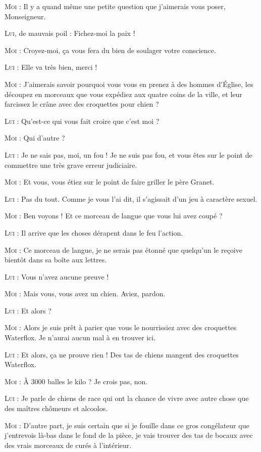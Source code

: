 \begin{dialogue}

\textsc{Moi} : Il y a quand même une petite question que j’aimerais vous poser, Monseigneur.

\textsc{Lui}, de mauvais poil : Fichez-moi la paix !

\textsc{Moi} : Croyez-moi, ça vous fera du bien de soulager votre conscience.

\textsc{Lui} : Elle va très bien, merci !

\textsc{Moi} : J’aimerais savoir pourquoi vous vous en prenez à des hommes d’Église, les découpez en morceaux que vous expédiez aux quatre coins de la ville, et leur farcissez le crâne avec des croquettes pour chien ?

\textsc{Lui} : Qu’est-ce qui vous fait croire que c’est moi ?

\textsc{Moi} : Qui d’autre ?

\textsc{Lui} : Je ne sais pas, moi, un fou ! Je ne suis pas fou, et vous êtes sur le point de commettre une très grave erreur judiciaire.

\textsc{Moi} : Et vous, vous étiez sur le point de faire griller le père Granet.

\textsc{Lui} : Pas du tout. Comme je vous l’ai dit, il s’agissait d’un jeu à caractère sexuel.

\textsc{Moi} : Ben voyons ! Et ce morceau de langue que vous lui avez coupé ?

\textsc{Lui} : Il arrive que les choses dérapent dans le feu l’action.

\textsc{Moi} : Ce morceau de langue, je ne serais pas étonné que quelqu’un le reçoive bientôt dans sa boîte aux lettres.

\textsc{Lui} : Vous n’avez aucune preuve !

\textsc{Moi} : Mais vous, vous avez un chien. Aviez, pardon.

\textsc{Lui} : Et alors ?

\textsc{Moi} : Alors je suis prêt à parier que vous le nourrissiez avec des croquettes Waterflox. Je n’aurai aucun mal à en trouver ici.

\textsc{Lui} : Et alors, ça ne prouve rien ! Des tas de chiens mangent des croquettes Waterflox.

\textsc{Moi} : À 3000 balles le kilo ? Je crois pas, non.

\textsc{Lui} : Je parle de chiens de race qui ont la chance de vivre avec autre chose que des maîtres chômeurs et alcoolos.

\textsc{Moi} : D’autre part, je suis certain que si je fouille dans ce gros congélateur que j’entrevois là-bas dans le fond de la pièce, je vais trouver des tas de bocaux avec des vrais morceaux de curés à l’intérieur.

\end{dialogue}

